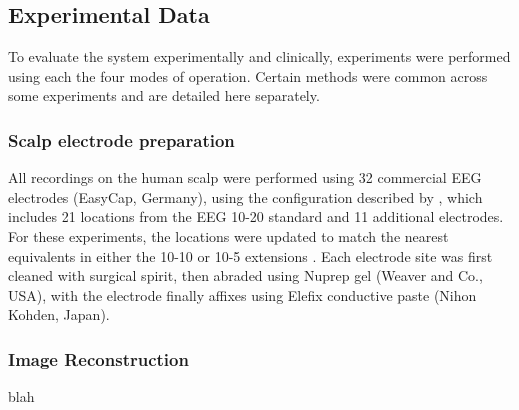 \subsection{Experimental Data}

To evaluate the system experimentally and clinically, experiments were performed using each the four modes of operation. Certain methods were common across some experiments and are detailed here separately. 

\subsubsection{Scalp electrode preparation}
All recordings on the human scalp were performed using 32 commercial EEG electrodes (EasyCap, Germany), using the configuration described by \citet{tidswell2001three}, which includes 21 locations from the EEG 10-20 standard \cite{Jasper1958} and 11 additional electrodes. For these experiments, the locations were updated to match the nearest equivalents in either the 10-10 or 10-5 extensions \cite{Oostenveld2001}. Each electrode site was first cleaned with surgical spirit, then abraded using Nuprep gel (Weaver and Co., USA), with the electrode finally affixes using Elefix conductive paste (Nihon Kohden, Japan). 

\subsubsection{Image Reconstruction}
blah











